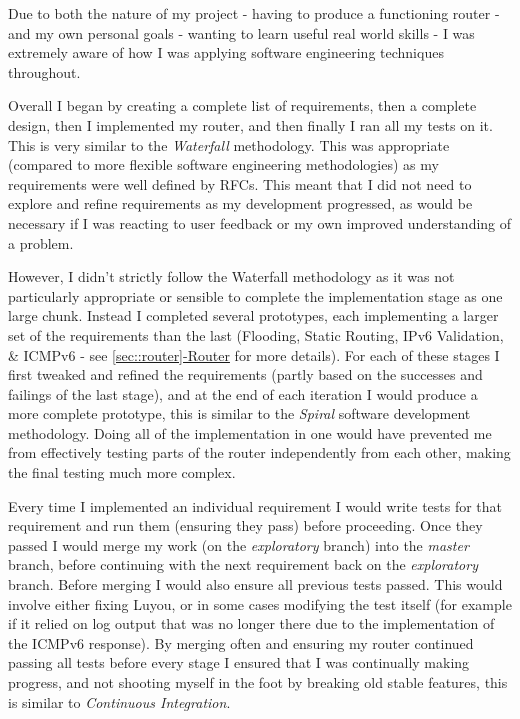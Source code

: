 \documentclass[12pt,a4paper,twoside,openright]{report}
\begin{document}
Due to both the nature of my project - having to produce a functioning router - and my own personal goals - wanting to learn useful real world skills - I was extremely aware of how I was applying software engineering techniques throughout.

\bigskip

Overall I began by creating a complete list of requirements, then a complete design, then I implemented my router, and then finally I ran all my tests on it.  This is very similar to the \textit{Waterfall} methodology.  This was appropriate (compared to more flexible software engineering methodologies) as my requirements were well defined by RFCs. This meant that I did not need to explore and refine requirements as my development progressed, as would be necessary if I was reacting to user feedback or my own improved understanding of a problem.

\bigskip

However, I didn't strictly follow the Waterfall methodology as it was not particularly appropriate or sensible to complete the implementation stage as one large chunk.  Instead I completed several prototypes, each implementing a larger set of the requirements than the last (Flooding, Static Routing, IPv6 Validation, \& ICMPv6 - see \ref{sec::router}\hyperref[sec::router]{-Router} for more details). For each of these stages I first tweaked and refined the requirements (partly based on the successes and failings of the last stage), and at the end of each iteration I would produce a more complete prototype, this is similar to the \textit{Spiral} software development methodology. Doing all of the implementation in one would have prevented me from effectively testing parts of the router independently from each other, making the final testing much more complex.

\bigskip

Every time I implemented an individual requirement I would write tests for that requirement and run them (ensuring they pass) before proceeding.  Once they passed I would merge my work (on the \textit{exploratory} branch) into the \textit{master} branch, before continuing with the next requirement back on the \textit{exploratory} branch.  Before merging I would also ensure all previous tests passed.  This would involve either fixing Luyou, or in some cases modifying the test itself (for example if it relied on log output that was no longer there due to the implementation of the ICMPv6 response).  By merging often and ensuring my router continued passing all tests before every stage I ensured that I was continually making progress, and not shooting myself in the foot by breaking old stable features, this is similar to \textit{Continuous Integration}.
\end{document}
